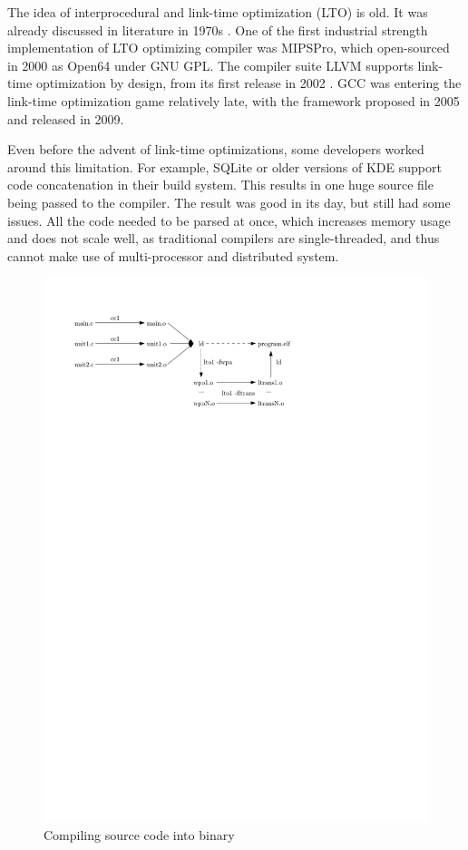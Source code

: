 The idea of interprocedural and link-time optimization (LTO) is old. 
It was already discussed in literature in 1970s \cite{Allen:1974,Allen:1976}.
One of the first industrial strength implementation of LTO optimizing compiler
was MIPSPro, which open-sourced in 2000 as Open64 under GNU GPL. The
compiler suite LLVM supports link-time optimization by design, from its first
release in 2002 \cite{lattner2002llvm}.  GCC was entering the link-time
optimization game relatively late, with the framework proposed in 2005
\cite{gcclto,briggs2007whopr} and released in 2009.

Even before the advent of link-time optimizations, some developers worked around
this limitation. For example, SQLite or older versions of KDE support code
concatenation in their build system. This results in one huge source file being
passed to the compiler. The result was good in its day, but still had some
issues. All the code needed to be parsed at once, which increases memory usage
and does not scale well, as traditional compilers are single-threaded, and thus
cannot make use of multi-processor and distributed system.

\begin{figure}[!ht]
	\centering
	\includegraphics{./img/lto-workflow.pdf}
	\caption{Compiling source code into binary}
	\label{figure-lto-workflow}
\end{figure}

